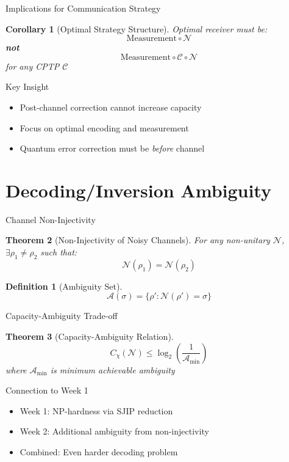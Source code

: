 \documentclass{beamer}
\theoremstyle{definition}
\newtheorem{defi}{Definition}[section]
\theoremstyle{plain}
\newtheorem{thm}{Theorem}[section]
\newtheorem{cor}[thm]{Corollary}
\begin{document}
\begin{frame}{Implications for Communication Strategy}
    \begin{cor}[Optimal Strategy Structure]
        Optimal receiver must be:
        \[
        \mathrm{Measurement} \circ \mathcal{N}
        \]
        \textbf{not}
        \[
        \mathrm{Measurement} \circ \mathcal{C} \circ \mathcal{N}
        \]
        for any CPTP $\mathcal{C}$
    \end{cor}
    
    \begin{block}{Key Insight}
        \begin{itemize}
            \item Post-channel correction cannot increase capacity
            \item Focus on optimal encoding and measurement
            \item Quantum error correction must be \textit{before} channel
        \end{itemize}
    \end{block}
\end{frame}

\section{Decoding/Inversion Ambiguity}

\begin{frame}{Channel Non-Injectivity}
    \begin{thm}[Non-Injectivity of Noisy Channels]
        For any non-unitary $\mathcal{N}$, $\exists \rho_1 \neq \rho_2$ such that:
        \[
        \mathcal{N}(\rho_1) = \mathcal{N}(\rho_2)
        \]
    \end{thm}
    
    \begin{defi}[Ambiguity Set]
        \[
        \mathcal{A}(\sigma) = \{ \rho' : \mathcal{N}(\rho') = \sigma \}
        \]
    \end{defi}
\end{frame}

\begin{frame}{Capacity-Ambiguity Trade-off}
    \begin{thm}[Capacity-Ambiguity Relation]
        \[
        C_\chi(\mathcal{N}) \leq \log_2\left( \frac{1}{\mathcal{A}_{\min}} \right)
        \]
        where $\mathcal{A}_{\min}$ is minimum achievable ambiguity
    \end{thm}
    
    \begin{block}{Connection to Week 1}
        \begin{itemize}
            \item Week 1: NP-hardness via SJIP reduction
            \item Week 2: Additional ambiguity from non-injectivity
            \item Combined: Even harder decoding problem
        \end{itemize}
    \end{block}
\end{frame}
\end{document}
